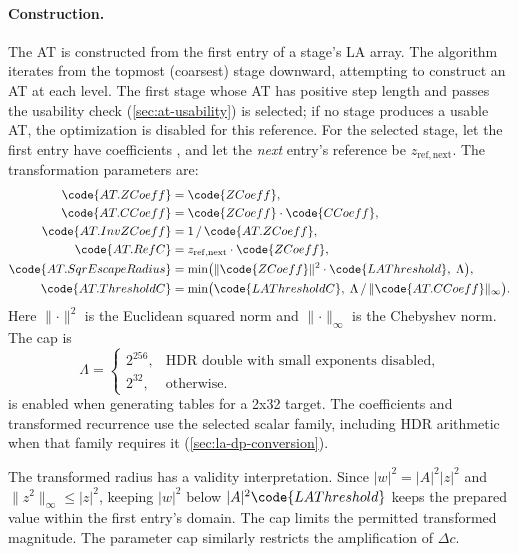 \paragraph{Construction.}
The AT is constructed from the first entry of a stage's LA array.
The algorithm iterates from the topmost (coarsest) stage downward,
attempting to construct an AT at each level.  The first stage whose
AT has positive step length and passes the usability check
(\cref{sec:at-usability}) is
selected; if no stage produces a usable AT, the optimization is
disabled for this reference.  For the selected stage, let the first
entry have coefficients ,  and let the
\emph{next} entry's reference be \(z_\mathrm{ref,next}\).  The
transformation parameters are:
\begin{align}
\code{AT.ZCoeff}   &= \code{ZCoeff}, \\
\code{AT.CCoeff}   &= \code{ZCoeff} \cdot \code{CCoeff}, \\
\code{AT.InvZCoeff}&= 1 \,/\, \code{AT.ZCoeff}, \\
\code{AT.RefC}     &= z_\mathrm{ref,next} \cdot \code{ZCoeff}, \\
\code{AT.SqrEscapeRadius} &= \min\bigl(
      \lVert\code{ZCoeff}\rVert^2 \cdot \code{LAThreshold},\;
      \Lambda\bigr), \\
\code{AT.ThresholdC} &= \min\bigl(
      \code{LAThresholdC},\;
      \Lambda \,/\, \lVert\code{AT.CCoeff}\rVert_\infty\bigr).
\end{align}
Here $\lVert\cdot\rVert^2$ is the Euclidean squared norm and
$\lVert\cdot\rVert_\infty$ is the Chebyshev norm. The cap is
\[
\Lambda=\begin{cases}
2^{256}, & \text{HDR double with small exponents disabled},\\
2^{32}, & \text{otherwise}.
\end{cases}
\]
 is enabled when generating tables for a
2x32 target. The coefficients and transformed recurrence use the
selected scalar family, including HDR arithmetic when that family
requires it (\cref{sec:la-dp-conversion}).

The transformed radius has a validity interpretation. Since
$|w|^2=|A|^2|z|^2$ and
$\lVert z^2\rVert_\infty\le|z|^2$, keeping $|w|^2$ below
$|A|^2\code{LAThreshold}$ keeps the prepared value within the first
entry's domain. The cap limits the permitted transformed magnitude.
The parameter cap similarly restricts the amplification of $\Delta c$.

